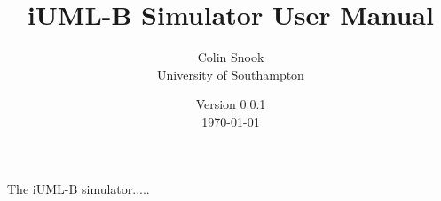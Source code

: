 \documentclass[a4paper,10pt]{article}
\title{iUML-B Simulator User Manual}
\author{Colin Snook\\University of Southampton}
\date{%
  Version 0.0.1\\%
  \today%
}
\begin{document}
\ifplastex%
\maketitle%
\else%
 \ifstandalone%
 \maketitle %
 \else%
 \fi%
\fi%

The iUML-B simulator..... 











%
\end{document}
